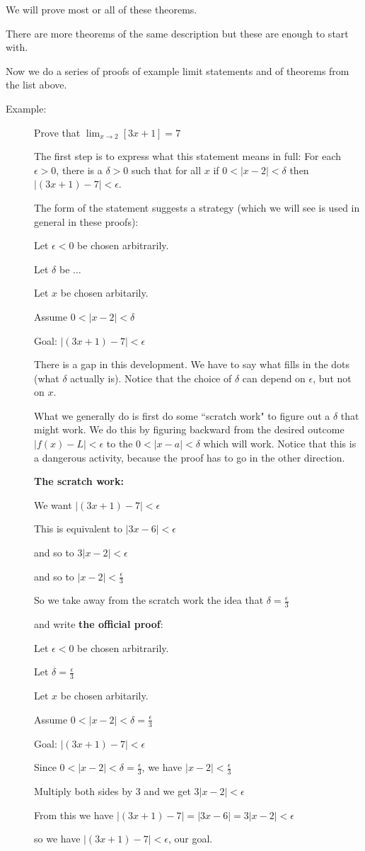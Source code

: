 \documentclass[12pt]{article}
\begin{document}
We will prove most or all of these theorems.

There are more theorems of the same description but these are enough to start with.

Now we do a series of proofs of example limit statements and of theorems from the list above.

\begin{description}

\item[Example:]  Prove that $\lim_{x\rightarrow 2}[ 3x+1] = 7$

The first step is to express what this statement means in full:  For each $\epsilon>0$, there is a $\delta >0$ such that for all $x$ if $0<|x-2|<\delta$ then $|(3x+1)-7|<\epsilon$.

The form of the statement suggests a strategy (which we will see is used in general in these proofs):

Let $\epsilon <0$ be chosen arbitrarily.

Let $\delta$ be $\ldots$

Let $x$ be chosen arbitarily.

Assume $0<|x-2|<\delta$

Goal:  $|(3x+1)-7|<\epsilon$

There is a gap in this development.  We have to say what fills in the dots (what $\delta$ actually is).  Notice that the choice of $\delta$ can depend on $\epsilon$, but not on $x$.

What we generally do is first do some ``scratch work" to figure out a $\delta$ that might work.  We do this by figuring backward from the desired
outcome $|f(x)-L|<\epsilon$ to the $0<|x-a|<\delta$ which will work.  Notice that this is a dangerous activity, because the proof has to go  in the other direction.

{\bf The scratch work:}

We want $|(3x+1)-7|<\epsilon$

This is equivalent to $|3x-6|<\epsilon$

and so to $3|x-2|<\epsilon$

and so to $|x-2|<\frac{\epsilon}3$

So we take away from the scratch work the idea that $\delta =\frac{\epsilon}3$

and write {\bf the official proof}:

Let $\epsilon <0$ be chosen arbitrarily.

Let $\delta = \frac{\epsilon}3$

Let $x$ be chosen arbitarily.

Assume $0<|x-2|<\delta=\frac{\epsilon}3$

Goal:  $|(3x+1)-7|<\epsilon$

Since $0<|x-2|<\delta=\frac{\epsilon}3$, we have $|x-2|<\frac{\epsilon}3$

Multiply both sides by 3 and we get $3|x-2| < \epsilon$

From this we have $|(3x+1)-7| = |3x-6| = 3|x-2| < \epsilon$

so we have $|(3x+1)-7| < \epsilon$, our goal.

\end{description}
\end{document}
